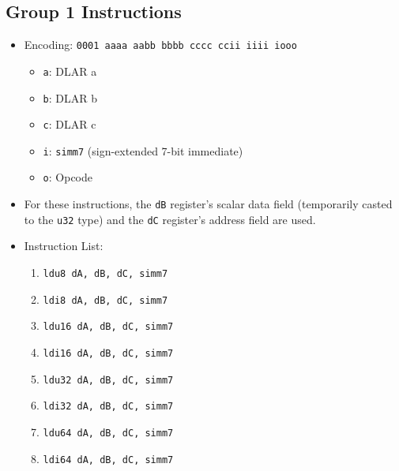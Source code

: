 \documentclass{article}
\begin{document}
	\subsection{Group 1 Instructions}
		\begin{itemize}
		\item Encoding: \texttt{0001 aaaa aabb bbbb  cccc ccii iiii iooo}
			\begin{itemize}
			\item \texttt{a}:  DLAR a
			\item \texttt{b}:  DLAR b
			\item \texttt{c}:  DLAR c
			\item \texttt{i}:  \texttt{simm7} (sign-extended 7-bit
			immediate)
			\item \texttt{o}:  Opcode
			\end{itemize}

		\item For these instructions, the \texttt{dB} register's scalar
		data field (temporarily casted to the \texttt{u32} type) and the
		\texttt{dC} register's address field are used. 

		\item Instruction List:
			\begin{enumerate}
			\item \texttt{ldu8 dA, dB, dC, simm7}
			\item \texttt{ldi8 dA, dB, dC, simm7}
			\item \texttt{ldu16 dA, dB, dC, simm7}
			\item \texttt{ldi16 dA, dB, dC, simm7}
			\item \texttt{ldu32 dA, dB, dC, simm7}
			\item \texttt{ldi32 dA, dB, dC, simm7}
			\item \texttt{ldu64 dA, dB, dC, simm7}
			\item \texttt{ldi64 dA, dB, dC, simm7}
			\end{enumerate}
		\end{itemize}
		\newpage
\end{document}
